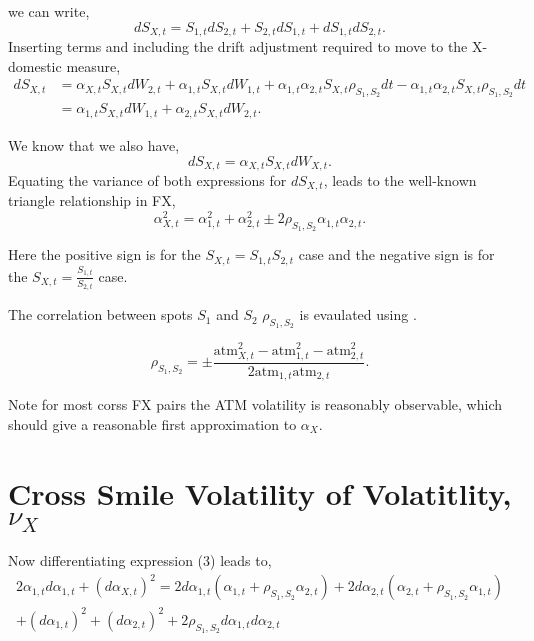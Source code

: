 \documentclass[12pt]{article}
\begin{document}
we can write,
$$dS_{X,t} = S_{1,t}dS_{2,t} + S_{2,t}dS_{1,t} + dS_{1,t}dS_{2,t}.$$
Inserting terms and including the drift adjustment required to move to the X-domestic measure,
\begin{equation}
  \begin{split}
    dS_{X,t} &= \alpha_{X,t}S_{X,t}dW_{2,t} + \alpha_{1,t}S_{X,t}dW_{1,t} + \alpha_{1,t}\alpha_{2,t}S_{X,t}\rho_{S_1,S_2}dt - \alpha_{1,t}\alpha_{2,t}S_{X,t}\rho_{S_1,S_2}dt \\
    &= \alpha_{1,t}S_{X,t}dW_{1,t} + \alpha_{2,t}S_{X,t}dW_{2,t}.
  \end{split}
\end{equation}

We know that we also have,
\begin{equation}
  dS_{X,t} = \alpha_{X,t}S_{X,t}dW_{X,t}.
\end{equation}
Equating the variance of both expressions for $dS_{X,t}$, leads to the well-known triangle relationship in FX,
\begin{equation}
  \alpha^2_{X,t} = \alpha^2_{1,t} + \alpha^2_{2,t} \pm 2\rho_{S_1,S_2}\alpha_{1,t}\alpha_{2,t}.
\end{equation}

Here the positive sign is for the $S_{X,t} = S_{1,t}S_{2,t}$ case and the negative sign is for the $S_{X,t} = \frac{S_{1,t}}{S_{2,t}}$ case.

The correlation between spots $S_1$ and $S_2$ $\rho_{S_1,S_2}$ is evaulated using .

\begin{equation}
  \rho_{S_1,S_2} = \pm \frac{\text{atm}^2_{X,t} - \text{atm}^2_{1,t} - \text{atm}^2_{2,t} } { 2\text{atm}_{1,t}\text{atm}_{2,t}}.
\end{equation}

Note for most corss FX pairs the ATM volatility is reasonably observable, which should give a reasonable first approximation to $\alpha_X$.


\section{Cross Smile Volatility of Volatitlity, $\nu_X$}
\paragraph*{}
Now differentiating expression (3) leads to,
\begin{multline}
  2\alpha_{1,t}d\alpha_{1,t} + (d\alpha_{X,t})^2 = 2d\alpha_{1,t}(\alpha_{1,t} + \rho_{S_1,S_2}\alpha_{2,t}) + 2d\alpha_{2,t}(\alpha_{2,t} + \rho_{S_1,S_2}\alpha_{1,t}) \\
  + (d\alpha_{1,t})^2 + (d\alpha_{2,t})^2 + 2\rho_{S_1,S_2}d\alpha_{1,t}d\alpha_{2,t}
\end{multline}
\end{document}
